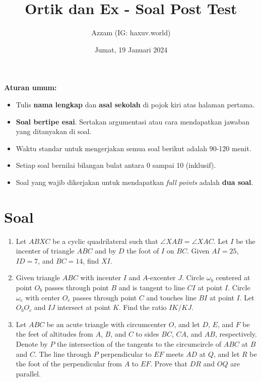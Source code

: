 \documentclass[12pt]{scrartcl}
\title{Ortik dan Ex - Soal Post Test}
\author{Azzam (IG: haxuv.world)}
\date{Jumat, 19 Januari 2024}
\begin{document}
\maketitle

\renewcommand*\contentsname{Daftar Isi}
\tableofcontents

\newpage
\textbf{Aturan umum:}
\begin{itemize}
    \item Tulis \textbf{nama lengkap} dan \textbf{asal sekolah} di pojok kiri atas halaman pertama.
    \item \textbf{Soal bertipe esai}. Sertakan argumentasi atau cara mendapatkan jawaban yang ditanyakan di soal.
    \item Waktu standar untuk mengerjakan semua soal berikut adalah 90-120 menit.
    \item Setiap soal bernilai bilangan bulat antara 0 sampai 10 (inklusif).
    \item Soal yang wajib dikerjakan untuk mendapatkan \textit{full points} adalah \textbf{dua soal}.
\end{itemize}


\section{Soal}
\begin{enumerate}
\item Let $ABXC$ be a cyclic quadrilateral such that $\angle XAB = \angle XAC$. Let $I$ be the incenter of triangle $ABC$ and by $D$ the foot of $I$ on $BC$. Given $AI = 25$, $ID = 7$, and $BC = 14$, find $XI$.

\item Given triangle $ABC$ with incenter $I$ and $A$-excenter $J$. Circle $\omega_b$ centered at point $O_b$ passes through point $B$ and is tangent to line $CI$ at point $I$. Circle $\omega_c$ with center $O_c$ passes through point $C$ and touches line $BI$ at point $I$. Let $O_bO_c$ and $IJ$ intersect at point $K$. Find the ratio $IK/KJ$.

\item Let $ABC$ be an acute triangle with circumcenter $O$, and let $D$, $E$, and $F$ be the feet of altitudes from $A$, $B$, and $C$ to sides $BC$, $CA$, and $AB$, respectively. Denote by $P$ the intersection of the tangents to the circumcircle of $ABC$ at $B$ and $C$. The line through $P$ perpendicular to $EF$ meets $AD$ at $Q$, and let $R$ be the foot of the perpendicular from $A$ to $EF$. Prove that $DR$ and $OQ$ are parallel.
\end{enumerate}
\end{document}
